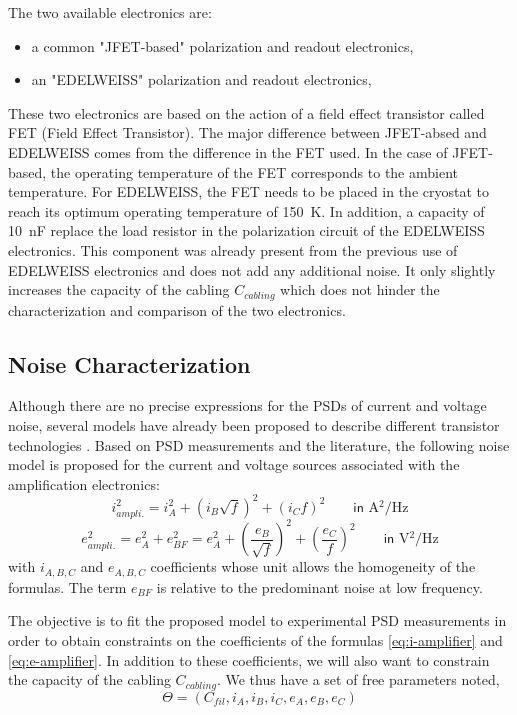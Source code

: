 The two available electronics are:
\begin{itemize}
\item a common "JFET-based" polarization and readout electronics,
\item an "EDELWEISS" polarization and readout electronics,
\end{itemize}
These two electronics are based on the action of a field effect transistor called FET (Field Effect Transistor). The major difference between JFET-absed and EDELWEISS comes from the difference in the FET used. In the case of JFET-based, the operating temperature of the FET corresponds to the ambient temperature. For EDELWEISS, the FET needs to be placed in the cryostat to reach its optimum operating temperature of \SI{150}{\kelvin}. In addition, a capacity of \SI{10}{\nano\farad} replace the load resistor in the polarization circuit of the EDELWEISS electronics. This component was already present from the previous use of EDELWEISS electronics and does not add any additional noise. It only slightly increases the capacity of the cabling  $C_{cabling}$ which does not hinder the characterization and comparison of the two electronics.


\subsection{Noise Characterization}

Although there are no precise expressions for the PSDs of current and voltage noise, several models have already been proposed to describe different transistor technologies \cite{Motchenbacher:1993low} \cite{Juillard:1999}.
Based on PSD measurements and the literature, the following noise model is proposed for the current and voltage sources associated with the amplification electronics:
\begin{equation}
\label{eq:i-amplifier}
i_{ampli.}^2 = i_A^2 + (i_B \sqrt{f})^2 + (i_C f)^2 \qquad \textsf{in } \si{\ampere^2\per\Hz}
\end{equation}
\begin{equation}
\label{eq:e-amplifier}
e_{ampli.}^2 = e_A^2 + e_{BF}^2 = e_A^2 + \left( \frac{e_B}{\sqrt{f}} \right)^2 +\left( \frac{e_C}{f} \right)^2 \qquad \textsf{in } \si{\volt^2\per\Hz}
\end{equation}
with $i_{A,B,C}$ and $e_{A,B,C}$ coefficients whose unit allows the homogeneity of the formulas. The term $e_{BF}$ is relative to the predominant noise at low frequency.

The objective is to fit the proposed model to experimental PSD measurements in order to obtain constraints on the coefficients of the formulas \ref{eq:i-amplifier} and \ref{eq:e-amplifier}. In addition to these coefficients, we will also want to constrain the capacity of the cabling $C_{cabling}$. We thus have a set of free parameters noted,
\begin{equation}
\Theta=(C_{fil}, i_A, i_B, i_C, e_A, e_B, e_C)
\end{equation}


